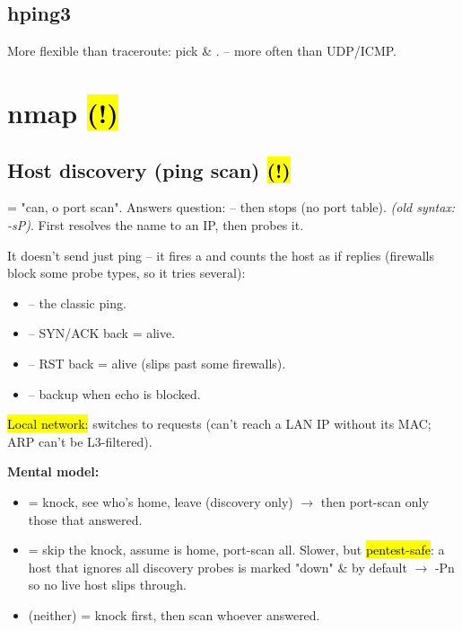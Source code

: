 \subsection{hping3}
More flexible than traceroute: pick  \& .  --  more often than UDP/ICMP.

\section{nmap \hl{(!)}}

\subsection{Host discovery (ping scan) \hl{(!)}}
 = "can, o port scan". Answers  question:  -- then stops (no port table). \textit{(old syntax: -sP)}. First resolves the name to an IP, then probes it.

It doesn't send just  ping -- it fires a  and counts the host as  if  replies (firewalls block some probe types, so it tries several):
{\scriptsize
\begin{itemize}
\item {} -- the classic ping.
\item {} -- SYN/ACK back = alive.
\item {} -- RST back = alive (slips past some firewalls).
\item {} -- backup when echo is blocked.
\end{itemize}}
\hl{Local network:} switches to  requests (can't reach a LAN IP without its MAC; ARP can't be L3-filtered).

\textbf{Mental model:}
\begin{itemize}
\item {} = knock, see who's home, leave (discovery only) $\to$ then port-scan only those that answered.
\item {} = skip the knock, assume  is home, port-scan all. Slower, but \hl{pentest-safe}: a host that ignores all discovery probes is marked "down" \&  by default $\to$ -Pn so no live host slips through.
\item {} (neither) = knock first, then scan whoever answered.
\end{itemize}

